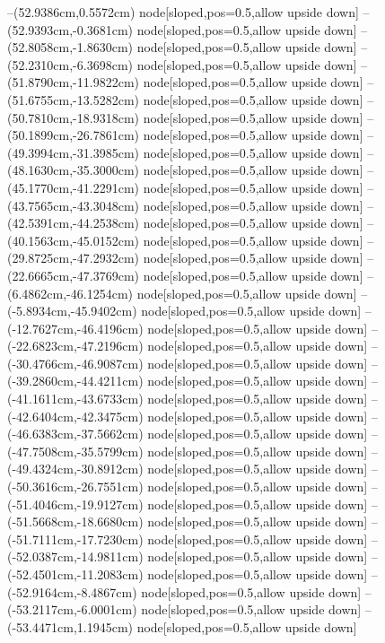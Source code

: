--(52.9386cm,0.5572cm) node[sloped,pos=0.5,allow upside down]{\ArrowIn}
--(52.9393cm,-0.3681cm) node[sloped,pos=0.5,allow upside down]{\arrowIn}
--(52.8058cm,-1.8630cm) node[sloped,pos=0.5,allow upside down]{\ArrowIn}
--(52.2310cm,-6.3698cm) node[sloped,pos=0.5,allow upside down]{\ArrowIn}
--(51.8790cm,-11.9822cm) node[sloped,pos=0.5,allow upside down]{\ArrowIn}
--(51.6755cm,-13.5282cm) node[sloped,pos=0.5,allow upside down]{\ArrowIn}
--(50.7810cm,-18.9318cm) node[sloped,pos=0.5,allow upside down]{\ArrowIn}
--(50.1899cm,-26.7861cm) node[sloped,pos=0.5,allow upside down]{\ArrowIn}
--(49.3994cm,-31.3985cm) node[sloped,pos=0.5,allow upside down]{\ArrowIn}
--(48.1630cm,-35.3000cm) node[sloped,pos=0.5,allow upside down]{\ArrowIn}
--(45.1770cm,-41.2291cm) node[sloped,pos=0.5,allow upside down]{\ArrowIn}
--(43.7565cm,-43.3048cm) node[sloped,pos=0.5,allow upside down]{\ArrowIn}
--(42.5391cm,-44.2538cm) node[sloped,pos=0.5,allow upside down]{\ArrowIn}
--(40.1563cm,-45.0152cm) node[sloped,pos=0.5,allow upside down]{\ArrowIn}
--(29.8725cm,-47.2932cm) node[sloped,pos=0.5,allow upside down]{\ArrowIn}
--(22.6665cm,-47.3769cm) node[sloped,pos=0.5,allow upside down]{\ArrowIn}
--(6.4862cm,-46.1254cm) node[sloped,pos=0.5,allow upside down]{\ArrowIn}
--(-5.8934cm,-45.9402cm) node[sloped,pos=0.5,allow upside down]{\ArrowIn}
--(-12.7627cm,-46.4196cm) node[sloped,pos=0.5,allow upside down]{\ArrowIn}
--(-22.6823cm,-47.2196cm) node[sloped,pos=0.5,allow upside down]{\ArrowIn}
--(-30.4766cm,-46.9087cm) node[sloped,pos=0.5,allow upside down]{\ArrowIn}
--(-39.2860cm,-44.4211cm) node[sloped,pos=0.5,allow upside down]{\ArrowIn}
--(-41.1611cm,-43.6733cm) node[sloped,pos=0.5,allow upside down]{\ArrowIn}
--(-42.6404cm,-42.3475cm) node[sloped,pos=0.5,allow upside down]{\ArrowIn}
--(-46.6383cm,-37.5662cm) node[sloped,pos=0.5,allow upside down]{\ArrowIn}
--(-47.7508cm,-35.5799cm) node[sloped,pos=0.5,allow upside down]{\ArrowIn}
--(-49.4324cm,-30.8912cm) node[sloped,pos=0.5,allow upside down]{\ArrowIn}
--(-50.3616cm,-26.7551cm) node[sloped,pos=0.5,allow upside down]{\ArrowIn}
--(-51.4046cm,-19.9127cm) node[sloped,pos=0.5,allow upside down]{\ArrowIn}
--(-51.5668cm,-18.6680cm) node[sloped,pos=0.5,allow upside down]{\ArrowIn}
--(-51.7111cm,-17.7230cm) node[sloped,pos=0.5,allow upside down]{\arrowIn}
--(-52.0387cm,-14.9811cm) node[sloped,pos=0.5,allow upside down]{\ArrowIn}
--(-52.4501cm,-11.2083cm) node[sloped,pos=0.5,allow upside down]{\ArrowIn}
--(-52.9164cm,-8.4867cm) node[sloped,pos=0.5,allow upside down]{\ArrowIn}
--(-53.2117cm,-6.0001cm) node[sloped,pos=0.5,allow upside down]{\ArrowIn}
--(-53.4471cm,1.1945cm) node[sloped,pos=0.5,allow upside down]{\ArrowIn}

